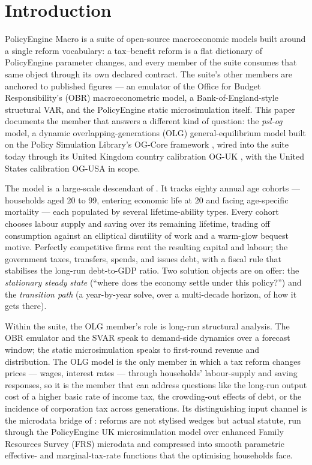 \section{Introduction}
\label{sec:intro}

PolicyEngine Macro is a suite of open-source macroeconomic models built around a single reform vocabulary: a tax--benefit reform is a flat dictionary of PolicyEngine parameter changes, and every member of the suite consumes that same object through its own declared contract. The suite's other members are anchored to published figures --- an emulator of the Office for Budget Responsibility's (OBR) macroeconometric model, a Bank-of-England-style structural VAR, and the PolicyEngine static microsimulation itself. This paper documents the member that answers a different kind of question: the \emph{psl-og} model, a dynamic overlapping-generations (OLG) general-equilibrium model built on the Policy Simulation Library's OG-Core framework \citep{DeBackerEvans2024}, wired into the suite today through its United Kingdom country calibration OG-UK \citep{OGUKdocs}, with the United States calibration OG-USA \citep{DeBackerEvansOGUSA} in scope.

The model is a large-scale descendant of \citet{AuerbachKotlikoff1987}. It tracks eighty annual age cohorts --- households aged 20 to 99, entering economic life at 20 and facing age-specific mortality --- each populated by several lifetime-ability types. Every cohort chooses labour supply and saving over its remaining lifetime, trading off consumption against an elliptical disutility of work and a warm-glow bequest motive. Perfectly competitive firms rent the resulting capital and labour; the government taxes, transfers, spends, and issues debt, with a fiscal rule that stabilises the long-run debt-to-GDP ratio. Two solution objects are on offer: the \emph{stationary steady state} (``where does the economy settle under this policy?'') and the \emph{transition path} (a year-by-year solve, over a multi-decade horizon, of how it gets there).

Within the suite, the OLG member's role is long-run structural analysis. The OBR emulator and the SVAR speak to demand-side dynamics over a forecast window; the static microsimulation speaks to first-round revenue and distribution. The OLG model is the only member in which a tax reform changes prices --- wages, interest rates --- through households' labour-supply and saving responses, so it is the member that can address questions like the long-run output cost of a higher basic rate of income tax, the crowding-out effects of debt, or the incidence of corporation tax across generations. Its distinguishing input channel is the microdata bridge of \citet{DeBackerEvansPhillips2019}: reforms are not stylised wedges but actual statute, run through the PolicyEngine UK microsimulation model \citep{PolicyEngineUK} over enhanced Family Resources Survey (FRS) microdata and compressed into smooth parametric effective- and marginal-tax-rate functions that the optimising households face.

